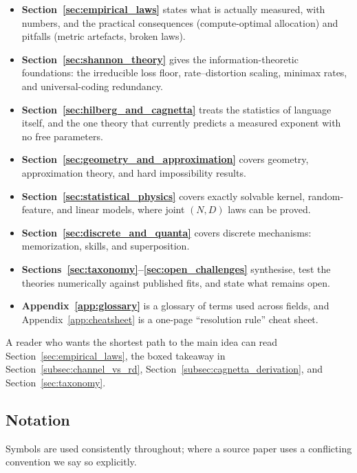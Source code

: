 \documentclass[11pt,a4paper]{article}
\theoremstyle{definition}
\begin{document}
\begin{itemize}[leftmargin=1.4em]
  \item \textbf{Section~\ref{sec:empirical_laws}} states what is actually measured, with numbers, and the practical consequences (compute-optimal allocation) and pitfalls (metric artefacts, broken laws).
  \item \textbf{Section~\ref{sec:shannon_theory}} gives the information-theoretic foundations: the irreducible loss floor, rate--distortion scaling, minimax rates, and universal-coding redundancy.
  \item \textbf{Section~\ref{sec:hilberg_and_cagnetta}} treats the statistics of language itself, and the one theory that currently predicts a measured exponent with no free parameters.
  \item \textbf{Section~\ref{sec:geometry_and_approximation}} covers geometry, approximation theory, and hard impossibility results.
  \item \textbf{Section~\ref{sec:statistical_physics}} covers exactly solvable kernel, random-feature, and linear models, where joint $(N,D)$ laws can be proved.
  \item \textbf{Section~\ref{sec:discrete_and_quanta}} covers discrete mechanisms: memorization, skills, and superposition.
  \item \textbf{Sections~\ref{sec:taxonomy}--\ref{sec:open_challenges}} synthesise, test the theories numerically against published fits, and state what remains open.
  \item \textbf{Appendix~\ref{app:glossary}} is a glossary of terms used across fields, and Appendix~\ref{app:cheatsheet} is a one-page ``resolution rule'' cheat sheet.
\end{itemize}

A reader who wants the shortest path to the main idea can read Section~\ref{sec:empirical_laws}, the boxed takeaway in Section~\ref{subsec:channel_vs_rd}, Section~\ref{subsec:cagnetta_derivation}, and Section~\ref{sec:taxonomy}.

\subsection{Notation}

Symbols are used consistently throughout; where a source paper uses a conflicting convention we say so explicitly.
\end{document}
